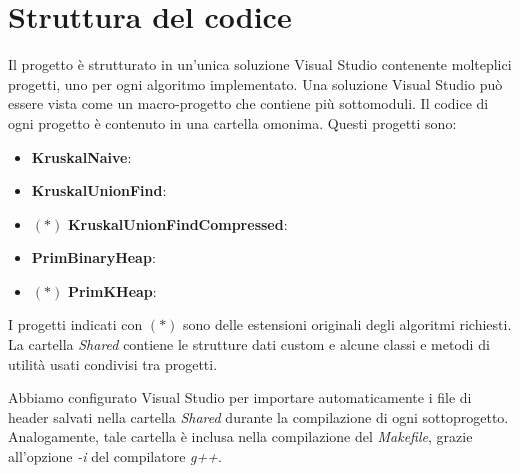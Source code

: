 \section{Struttura del codice}
\label{cap:code-structure}

Il progetto è strutturato in un'unica soluzione Visual Studio contenente molteplici progetti, uno per ogni algoritmo implementato.
Una soluzione Visual Studio può essere vista come un macro-progetto che contiene più sottomoduli.
Il codice di ogni progetto è contenuto in una cartella omonima.
Questi progetti sono:

\begin{itemize}
    \item \textbf{KruskalNaive}:
    \item \textbf{KruskalUnionFind}:
    \item $(*)$ \textbf{KruskalUnionFindCompressed}:
    \item \textbf{PrimBinaryHeap}:
    \item $(*)$ \textbf{PrimKHeap}:
\end{itemize}

\noindent I progetti indicati con $(*)$ sono delle estensioni originali degli algoritmi richiesti.
\\

\noindent La cartella \textit{Shared} contiene le strutture dati custom e alcune classi e metodi di utilità usati
condivisi tra progetti.

\noindent Abbiamo configurato Visual Studio per importare automaticamente i file di header salvati nella cartella \textit{Shared}
durante la compilazione di ogni sottoprogetto. Analogamente, tale cartella è inclusa nella compilazione del \textit{Makefile}, grazie all'opzione \textit{-i} del compilatore \textit{g++}.

